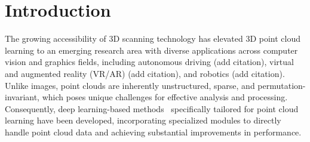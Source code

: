 \section{Introduction}
\label{sec:intro}



	The growing accessibility of 3D scanning technology has elevated 3D point cloud learning to an emerging research area with diverse applications across computer vision and graphics fields, including autonomous driving (add citation), virtual and augmented reality (VR/AR) (add citation), and robotics (add citation).  
	Unlike images, point clouds are inherently unstructured, sparse, and permutation-invariant, which poses unique challenges for effective analysis and processing. 
	Consequently, deep learning-based methods~\cite{qi2017pointnet, li2018pointcnn,qian2022pointnext,qi2017pointnet++,wang2019dynamic,wu2024point,wu2022point,zhang2022patchformer,park2022fast,zhao2021point,guo2021pct,ma2022rethinking} specifically tailored for point cloud learning have been developed, incorporating specialized modules to directly handle point cloud data and achieving substantial improvements in performance.

